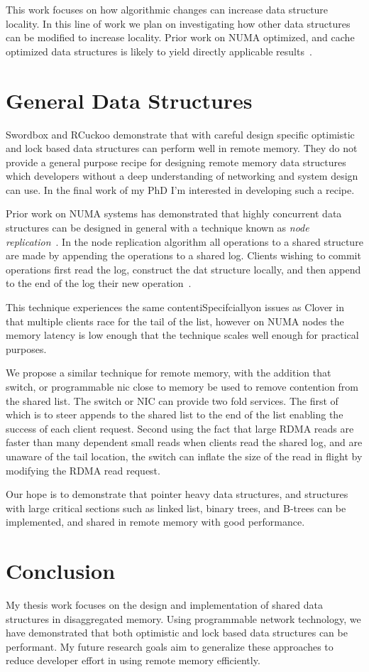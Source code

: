 This work focuses on how algorithmic changes can increase
data structure locality. In this line of work we plan on
investigating how other data structures can be modified to
increase locality. Prior work on NUMA optimized, and cache
optimized data structures is likely to yield directly
applicable results~\cite{hopscotch}.

\section{General Data Structures}

Swordbox and RCuckoo demonstrate that with careful design
specific optimistic and lock based data structures can
perform well in remote memory. They do not provide a general
purpose recipe for designing remote memory data structures
which developers without a deep understanding of networking
and system design can use. In the final work of my PhD I'm
interested in developing such a recipe.

Prior work on NUMA systems has demonstrated that highly
concurrent data structures can be designed in general with a
technique known as \textit{node
replication}~\cite{black-box-numa}. In the node replication
algorithm all operations to a shared structure are made by
appending the operations to a shared log. Clients wishing to
commit operations first read the log, construct the dat
structure locally, and then append to the end of the log
their new operation~\cite{black-box-numa}.

This technique experiences the same contentiSpecifciallyon issues as
Clover in that multiple clients race for the tail of the
list, however on NUMA nodes the memory latency is low enough
that the technique scales well enough for practical
purposes. 

We propose a similar technique for remote memory, with the
addition that switch, or programmable nic close to memory be
used to remove contention from the shared list. The switch
or NIC can provide two fold services. The first of which is
to steer appends to the shared list to the end of the list
enabling the success of each client request. Second using
the fact that large RDMA reads are faster than many
dependent small reads  when clients read the shared log, and
are unaware of the tail location, the switch can inflate the
size of the read in flight by modifying the RDMA read
request. 

Our hope is to demonstrate that pointer heavy data
structures, and structures with large critical sections such
as linked list, binary trees, and B-trees can be
implemented, and shared in remote memory with good
performance.

\section{Conclusion}

My thesis work focuses on the design and implementation of
shared data structures in disaggregated memory. Using
programmable network technology, we have demonstrated that
both optimistic and lock based data structures can be
performant. My future research goals aim to generalize these
approaches to reduce developer effort in using remote memory
efficiently.

